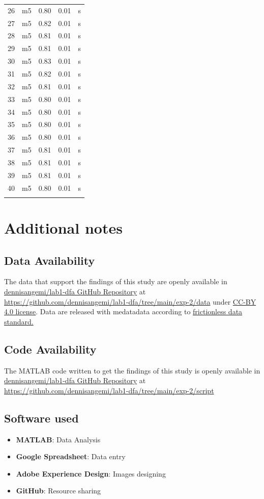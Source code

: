 \documentclass[11pt,a4paper]{article}
\begin{document}
\begin{longtable}[]{@{}lllll@{}}
26 & m5 & 0.80 & 0.01 & s \tabularnewline
27 & m5 & 0.82 & 0.01 & s \tabularnewline
28 & m5 & 0.81 & 0.01 & s \tabularnewline
29 & m5 & 0.81 & 0.01 & s \tabularnewline
30 & m5 & 0.83 & 0.01 & s \tabularnewline
31 & m5 & 0.82 & 0.01 & s \tabularnewline
32 & m5 & 0.81 & 0.01 & s \tabularnewline
33 & m5 & 0.80 & 0.01 & s \tabularnewline
34 & m5 & 0.80 & 0.01 & s \tabularnewline
35 & m5 & 0.80 & 0.01 & s \tabularnewline
36 & m5 & 0.80 & 0.01 & s \tabularnewline
37 & m5 & 0.81 & 0.01 & s \tabularnewline
38 & m5 & 0.81 & 0.01 & s \tabularnewline
39 & m5 & 0.81 & 0.01 & s \tabularnewline
40 & m5 & 0.80 & 0.01 & s \tabularnewline
\bottomrule
\label{expdata2}
\end{longtable}

\section{Additional notes}

\subsection{Data Availability}
The data that support the findings of this study are openly available in \href{https://github.com/dennisangemi/lab1-dfa/tree/main/exp-2/data}{dennisangemi/lab1-dfa GitHub Repository} at \href{https://github.com/dennisangemi/lab1-dfa/tree/main/exp-2/data}{https://github.com/dennisangemi/lab1-dfa/tree/main/exp-2/data} under \href{https://creativecommons.org/licenses/by/4.0/}{CC-BY 4.0 license}. Data are released with medatadata according to \href{https://frictionlessdata.io/standards/}{frictionless data standard.}

\subsection{Code Availability}
The MATLAB code written to get the findings of this study is openly available in \href{https://github.com/dennisangemi/lab1-dfa/tree/main/exp-2/script}{dennisangemi/lab1-dfa GitHub Repository} at \href{https://github.com/dennisangemi/lab1-dfa/tree/main/exp-2/script}{https://github.com/dennisangemi/lab1-dfa/tree/main/exp-2/script}


\subsection{Software used}
\begin{itemize}
\item
  \textbf{MATLAB}: Data Analysis
\item
  \textbf{Google Spreadsheet}: Data entry
\item
  \textbf{Adobe Experience Design}: Images designing
\item
  \textbf{GitHub}: Resource sharing
\end{itemize}
\end{document}
